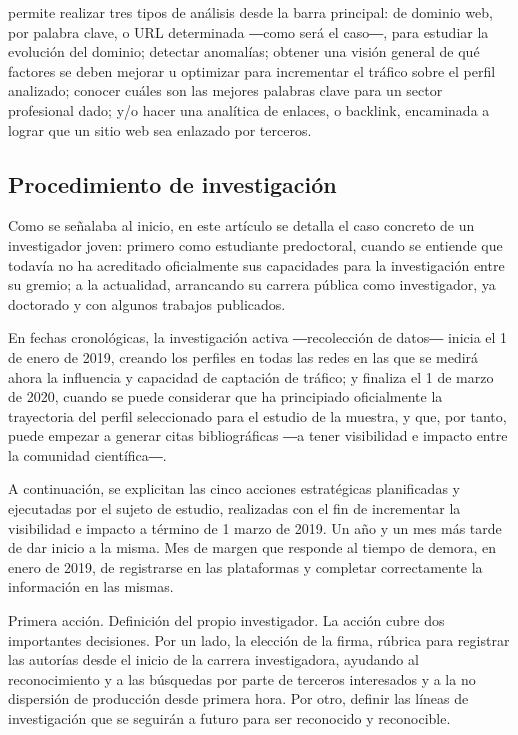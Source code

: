 \documentclass{textolivre}
\begin{document}
\textcite{noauthor_semrush_nodate} %
permite realizar tres tipos de análisis desde la barra principal: de dominio web, por palabra clave, o URL determinada ―como será el caso―, para estudiar la evolución del dominio; detectar anomalías; obtener una visión general de qué factores se deben mejorar u optimizar para incrementar el tráfico sobre el perfil analizado; conocer cuáles son las mejores palabras clave para un sector profesional dado; y/o hacer una analítica de enlaces, o backlink, encaminada a lograr que un sitio web sea enlazado por terceros.

\subsection{Procedimiento de investigación}\label{sec-procedimento}
Como se señalaba al inicio, en este artículo se detalla el caso concreto de un investigador joven: primero como estudiante predoctoral, cuando se entiende que todavía no ha acreditado oficialmente sus capacidades para la investigación entre su gremio; a la actualidad, arrancando su carrera pública como investigador, ya doctorado y con algunos trabajos publicados. 

En fechas cronológicas, la investigación activa ―recolección de datos― inicia el 1 de enero de 2019, creando los perfiles en todas las redes en las que se medirá ahora la influencia y capacidad de captación de tráfico; y finaliza el 1 de marzo de 2020, cuando se puede considerar que ha principiado oficialmente la trayectoria del perfil seleccionado para el estudio de la muestra, y que, por tanto, puede empezar a generar citas bibliográficas ―a tener visibilidad e impacto entre la comunidad científica―.

A continuación, se explicitan las cinco acciones estratégicas planificadas y ejecutadas por el sujeto de estudio, realizadas con el fin de incrementar la visibilidad e impacto a término de 1 marzo de 2019. Un año y un mes más tarde de dar inicio a la misma. Mes de margen que responde al tiempo de demora, en enero de 2019, de registrarse en las plataformas y completar correctamente la información en las mismas.

Primera acción. Definición del propio investigador. La acción cubre dos importantes decisiones. Por un lado, la elección de la firma, rúbrica para registrar las autorías desde el inicio de la carrera investigadora, ayudando al reconocimiento y a las búsquedas por parte de terceros interesados y a la no dispersión de producción desde primera hora. Por otro, definir las líneas de investigación que se seguirán a futuro para ser reconocido y reconocible.
\end{document}
